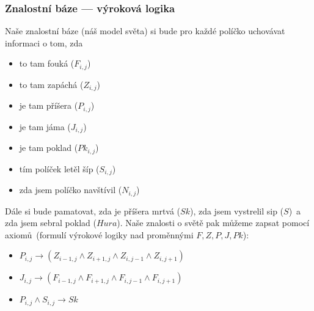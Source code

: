 \documentclass[red,professionalfont]{beamer}
\theoremstyle{definition}
\newcommand{\0}{\mbox{${\bf 0}$}}
\begin{document}
\begin{frame}\frametitle{Znalostní báze --- výroková logika}
 Naše znalostní báze (náš model světa) si bude pro každé políčko
 uchovávat informaci o tom, zda
 \begin{itemize}
  \item to tam fouká ($F_{i,j}$)\pause
  \item to tam zapáchá ($Z_{i,j}$)\pause
  \item je tam příšera ($P_{i,j}$)\pause
  \item je tam jáma ($J_{i,j}$)\pause
  \item je tam poklad ($Pk_{i,j}$)\pause
  \item tím políček letěl šíp ($S_{i,j}$)\pause
  \item zda jsem políčko navštívil ($N_{i,j}$)
 \end{itemize}\pause
 Dále si bude pamatovat\pause, zda je příšera mrtvá ($Sk$)\pause, zda jsem vystrelil sip ($S$)\pause\ a zda jsem sebral poklad ($Hura$)\pause.
 Naše znalosti o světě pak můžeme zapsat pomocí axiomů\pause\ (formulí výrokové logiky nad proměnnými $F,Z,P,J,Pk$):\pause
 \begin{itemize}
  \item $P_{i,j}\rightarrow (Z_{i-1,j}\wedge Z_{i+1,j}\wedge Z_{i,j-1}\wedge Z_{i,j+1})$\pause
  \item $J_{i,j}\rightarrow (F_{i-1,j}\wedge F_{i+1,j}\wedge F_{i,j-1}\wedge F_{i,j+1})$\pause
  \item $P_{i,j}\wedge S_{i,j}\rightarrow Sk$
 \end{itemize}
\end{frame}
\end{document}
